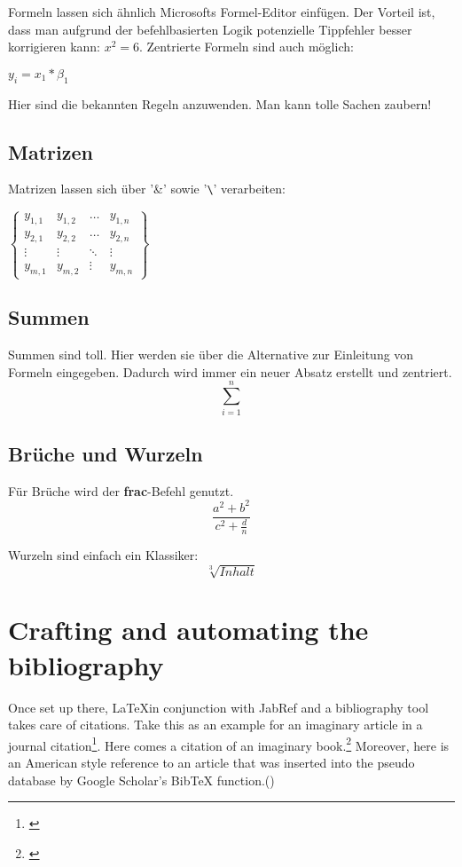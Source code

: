 \documentclass[a4paper]{scrartcl}
\begin{document}
	Formeln lassen sich ähnlich Microsofts Formel-Editor einfügen. Der Vorteil ist, dass man aufgrund der befehlbasierten Logik potenzielle Tippfehler besser korrigieren kann: $ x^2 =6 $. Zentrierte Formeln sind auch möglich:
	\begin{center}
		$ y_i =x_1*\beta_1 $
	\end{center}
	
	Hier sind die bekannten Regeln anzuwenden. Man kann tolle Sachen zaubern!
	\subsection{Matrizen}
	Matrizen lassen sich über '\&' sowie '\verb=\=' verarbeiten:
	
	\begin{center}
		$
		\begin{Bmatrix}
		y_{1,1} & y_{1,2} & \dots & y_{1,n} \\
		y_{2,1} & y_{2,2} & \dots & y_{2,n} \\
		\vdots & \vdots & \ddots & \vdots \\
		y_{m,1} & y_{m,2} & \vdots & y_{m,n}
		\end{Bmatrix}
		$
	\end{center}
	
	\subsection{Summen}
	\label{sums}
	Summen sind toll. Hier werden sie über die Alternative zur Einleitung von Formeln eingegeben. Dadurch wird immer ein neuer Absatz erstellt und zentriert.
	\[  \sum_{i=1}^n \]
	
	\subsection{Brüche und Wurzeln}
	Für Brüche wird der \textbf{frac}-Befehl genutzt.
	\[ \frac{a^2+b^2}{c^2+\frac{d}{n}} \]
	
	Wurzeln sind einfach ein Klassiker:
	\[ \sqrt[3]{Inhalt} \]
	
	
	\newpage
	
	\newpage
	\section{Crafting and automating the bibliography}
	Once set up there, \LaTeX in conjunction with JabRef and a bibliography tool takes care of citations. Take this as an example for an imaginary article in a journal citation\footnote{\cite{demo_art}}.
	Here comes a citation of an imaginary book.\footnote{\cite{demo_book}} Moreover, here is an American style reference to an article that was inserted into the pseudo database by Google Scholar's BibTeX function.(\cite{demo_source})
	
\end{document}
